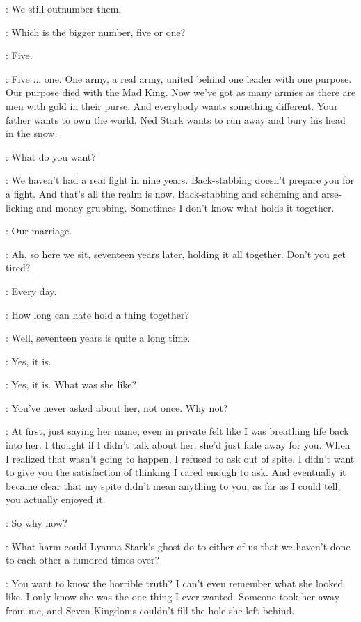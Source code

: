 \CERSEI: We still outnumber them. 

\ROBERT: Which is the bigger number, five or one? 

\CERSEI: Five. 

\ROBERT:  Five $\ldots$ one. One army, a real army, united behind one leader with one purpose. Our purpose died with the Mad King. Now we've got as many armies as there are men with gold in their purse. And everybody wants something different. Your father wants to own the world. Ned Stark wants to run away and bury his head in the snow. 

\CERSEI: What do you want? 

\ROBERT: We haven't had a real fight in nine years. Back-stabbing doesn't prepare you for a fight. And that's all the realm is now. Back-stabbing and scheming and arse-licking and money-grubbing. Sometimes I don't know what holds it together. 

\CERSEI: Our marriage. 


\ROBERT: Ah, so here we sit, seventeen years later, holding it all together. Don't you get tired? 

\CERSEI: Every day. 

\ROBERT: How long can hate hold a thing together? 

\CERSEI: Well, seventeen years is quite a long time. 

\ROBERT: Yes, it is. 

\CERSEI: Yes, it is. What was she like? 

\ROBERT: You've never asked about her, not once. Why not? 

\CERSEI: At first, just saying her name, even in private felt like I was breathing life back into her. I thought if I didn't talk about her, she'd just fade away for you. When I realized that wasn't going to happen, I refused to ask out of spite. I didn't want to give you the satisfaction of thinking I cared enough to ask. And eventually it became clear that my spite didn't mean anything to you, as far as I could tell, you actually enjoyed it. 

\ROBERT: So why now? 

\CERSEI: What harm could Lyanna Stark's ghost do to either of us that we haven't done to each other a hundred times over? 

\ROBERT: You want to know the horrible truth? I can't even remember what she looked like. I only know she was the one thing I ever wanted.  Someone took her away from me, and Seven Kingdoms couldn't fill the hole she left behind. 

